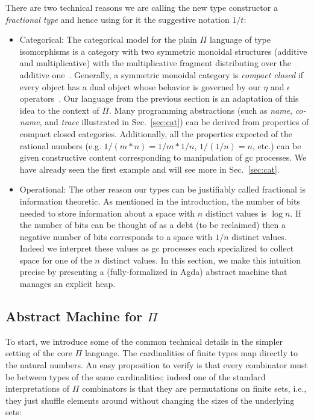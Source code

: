 \documentclass[sigplan,10pt,review,anonymous]{acmart}
\newcommand{\oneover}[1]{1/#1}
\begin{document}
There are two technical reasons we are calling the new type constructor a
\emph{fractional type} and hence using for it the suggestive notation
$\oneover{t}$:
\begin{itemize}
\item Categorical: The categorical model for the plain $\Pi$ language
  of type isomorphisms is a category with two symmetric monoidal
  structures (additive and multiplicative) with the multiplicative fragment
  distributing over the additive one~\cite{DBLP:conf/esop/CaretteS16}. Generally,
  a symmetric monoidal category is \emph{compact closed} if every
  object has a dual object whose behavior is governed by our $\eta$
  and $\epsilon$ operators~\cite{kelly1972many}. Our language from the previous
  section is an adaptation of this idea to the context of $\Pi$. Many
  programming abstractions (such as \emph{name}, \emph{co-name}, and
  \emph{trace} illustrated in Sec.~\ref{sec:cat}) can be
  derived from properties of compact closed categories. Additionally,
  all the properties expected of the rational numbers
  (e.g. $\oneover{(m*n)} = \oneover{m}*\oneover{n}$,
  $\oneover{(\oneover{n})}=n$, etc.) can be given constructive content
  corresponding to manipulation of gc processes. We have already seen
  the first example and will see more in Sec.~\ref{sec:cat}.

\item Operational: The other reason our types can be justifiably
  called fractional is information theoretic. As mentioned in the
  introduction, the number of bits needed to store information about a
  space with $n$ distinct values is $\log{n}$. If the number of bits
  can be thought of as a debt (to be reclaimed) then a negative number
  of bits corresponds to a space with $\oneover{n}$ distinct
  values. Indeed we interpret these values as gc processes each
  specialized to collect space for one of the $n$ distinct values. In
  this section, we make this intuition precise by presenting a
  (fully-formalized in Agda) abstract machine that manages an explicit
  heap.
\end{itemize}

\subsection{Abstract Machine for $\Pi$}

To start, we introduce some of the common technical details in the
simpler setting of the core $\Pi$ language. The cardinalities of
finite types map directly to the natural numbers. An easy proposition
to verify is that every combinator must be between types of the same
cardinalities; indeed one of the standard interpretations of $\Pi$
combinators is that they are permutations on finite sets, i.e., they
just shuffle elements around without changing the sizes of the
underlying sets:
\end{document}
